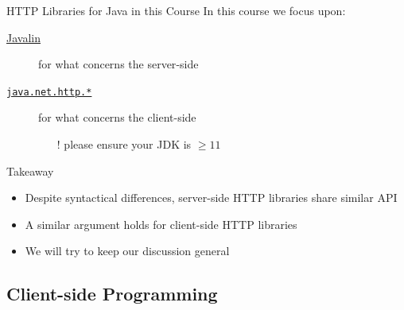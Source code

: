 \documentclass[presentation]{beamer}\mode<presentation>{\usetheme{AMSBolognaFC}}
\begin{document}
\begin{frame}{HTTP Libraries for Java in this Course}
    In this course we focus upon:
    \begin{description}
        \item[\href{https://javalin.io/}{Javalin}] for what concerns the \alert{server}-side
        \item[\href{https://docs.oracle.com/en/java/javase/11/docs/api/java.net.http/java/net/http/package-summary.html}{\texttt{java.net.http.*}}] for what concerns the \alert{client}-side
        \begin{itemize}
            \item[!] please ensure your JDK is $\geq 11$
        \end{itemize}
    \end{description}

    \vfill

    \begin{block}{Takeaway}
        \begin{itemize}
            \item Despite syntactical differences, server-side HTTP libraries share similar API
            \item A similar argument holds for client-side HTTP libraries
            \item We will try to keep our discussion general
        \end{itemize}
    \end{block}

\end{frame}

\subsection{Client-side Programming}
\end{document}

